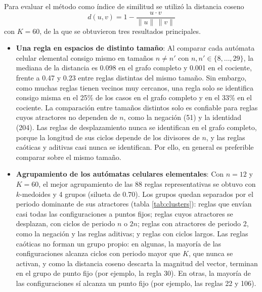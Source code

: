 Para evaluar el método como índice de similitud se utilizó la distancia coseno
\begin{equation}
	d(u, v) = 1 - \frac{u \cdot v}{\| u \| \, \| v \|}
\end{equation}
con $K = 60$, de la que se obtuvieron tres resultados principales.

\begin{itemize}
	\item \textbf{Una regla en espacios de distinto tamaño}: Al comparar cada autómata celular elemental consigo mismo en tamaños $n \neq n'$ con $n, n' \in \{8, \dots, 29\}$, la mediana de la distancia es 0.098 en el grafo completo y 0.001 en el cociente, frente a 0.47 y 0.23 entre reglas distintas del mismo tamaño. Sin embargo, como muchas reglas tienen vecinos muy cercanos, una regla solo se identifica consigo misma en el 25\% de los casos en el grafo completo y en el 33\% en el cociente. La comparación entre tamaños distintos solo es confiable para reglas cuyos atractores no dependen de $n$, como la negación (51) y la identidad (204). Las reglas de desplazamiento nunca se identifican en el grafo completo, porque la longitud de sus ciclos depende de los divisores de $n$, y las reglas caóticas y aditivas casi nunca se identifican. Por ello, en general es preferible comparar sobre el mismo tamaño.
	
	\item \textbf{Agrupamiento de los autómatas celulares elementales}: Con $n = 12$ y $K = 60$, el mejor agrupamiento de las 88 reglas representativas se obtuvo con $k$-medoides y 4 grupos (silueta de 0.70). Los grupos quedan separados por el periodo dominante de sus atractores (tabla \ref{tab:clusters}): reglas que envían casi todas las configuraciones a puntos fijos; reglas cuyos atractores se desplazan, con ciclos de periodo $n$ o $2n$; reglas con atractores de periodo 2, como la negación y las reglas aditivas; y reglas con ciclos largos. Las reglas caóticas no forman un grupo propio: en algunas, la mayoría de las configuraciones alcanza ciclos con periodo mayor que $K$, que nunca se activan, y como la distancia coseno descarta la magnitud del vector, terminan en el grupo de punto fijo (por ejemplo, la regla 30). En otras, la mayoría de las configuraciones sí alcanza un punto fijo (por ejemplo, las reglas 22 y 106).
\end{itemize}

